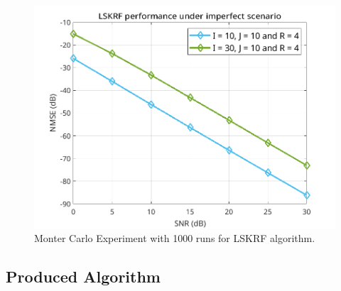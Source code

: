 \documentclass[a4paper,10pt]{article}
\begin{document}
    \begin{figure}[ht!]
        \centering 
        \includegraphics[width=0.75\linewidth]{figs/hw3.png} \par 
        \caption{Monter Carlo Experiment with 1000 runs for LSKRF algorithm.}
        \label{fig:hw3} 
    \end{figure}

    \newpage
    \subsection*{Produced Algorithm}
\end{document}
